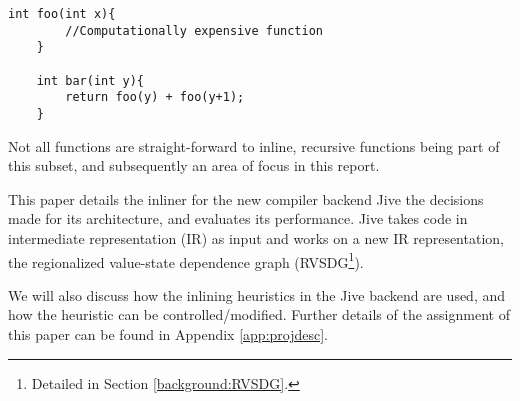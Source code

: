 
\begin{lstlisting}[caption={Work duplication if inlined},
label={lst:work-dup}, style=customcpp]
	int foo(int x){
		//Computationally expensive function
	}

	int bar(int y){
		return foo(y) + foo(y+1);
	}
\end{lstlisting}

Not all functions are straight-forward to inline, recursive functions being part
of this subset, and subsequently an area of focus in this report.


This paper details the
inliner for the new compiler backend Jive the decisions made for its
architecture, and evaluates its performance. Jive takes code in intermediate
representation (IR) as input and works on a new IR representation, the
regionalized value-state dependence graph (RVSDG\footnote{Detailed in Section
\ref{background:RVSDG}.}).

We will also discuss how the inlining heuristics in the Jive backend are used,
and how the heuristic can be controlled/modified. Further details of the
assignment of this paper can be found in Appendix \ref{app:projdesc}.
